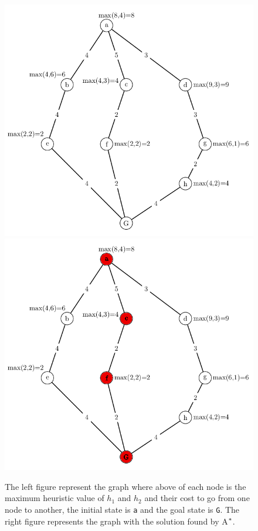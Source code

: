 \begin{figure}[!htb]
  \includegraphics[width=\linewidth]{images/marvinmaxfull-left}
\endminipage\hfill
{}
  \includegraphics[width=\linewidth]{images/marvinmaxfullacfG-right}
\endminipage
\caption{The left figure represent the graph where above of each node is the maximum heuristic value of $h_{1}$ and $h_{2}$ and their cost to go from one node to another, the initial state is \texttt{a} and the goal state is \texttt{G}. The right figure represents the graph with the solution found by A$\sp{*}$. }\label{fig:image_maxh1h2_astar}
\end{figure}

